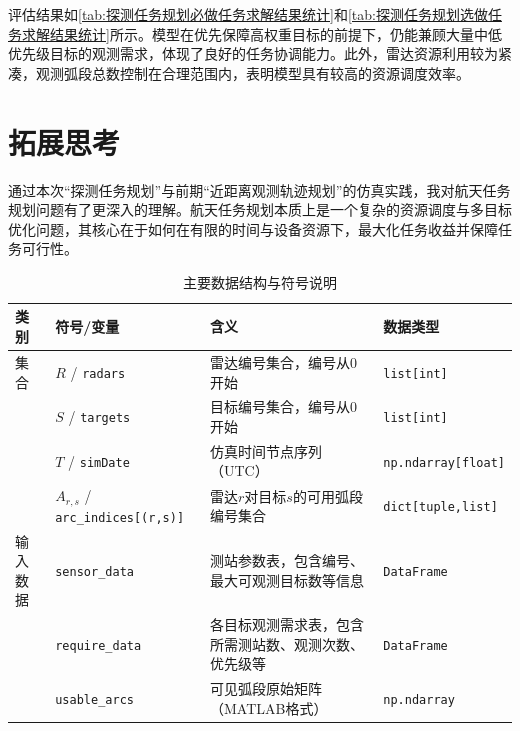 \documentclass[openany,12pt,UTF8]{ctexart}
\begin{document}
评估结果如\autoref{tab:探测任务规划必做任务求解结果统计}和\autoref{tab:探测任务规划选做任务求解结果统计}所示。模型在优先保障高权重目标的前提下，仍能兼顾大量中低优先级目标的观测需求，体现了良好的任务协调能力。此外，雷达资源利用较为紧凑，观测弧段总数控制在合理范围内，表明模型具有较高的资源调度效率。

\section{拓展思考}
通过本次“探测任务规划”与前期“近距离观测轨迹规划”的仿真实践，我对航天任务规划问题有了更深入的理解。航天任务规划本质上是一个复杂的资源调度与多目标优化问题，其核心在于如何在有限的时间与设备资源下，最大化任务收益并保障任务可行性。

\begin{table}
    \centering
    \caption{主要数据结构与符号说明}
    \label{table:主要数据结构与符号说明}
    \begin{tabularx}{\columnwidth}{llXl}
        \toprule
        类别   & 符号/变量                                                  & 含义                                             & 数据类型                       \\
        \midrule
        集合   & $R$ / \texttt{radars}                                  & 雷达编号集合，编号从0开始                                  & \texttt{list[int]}         \\
             & $S$ / \texttt{targets}                                 & 目标编号集合，编号从0开始                                  & \texttt{list[int]}         \\
             & $T$ / \texttt{simDate}                                 & 仿真时间节点序列（UTC）                                  & \texttt{np.ndarray[float]} \\
             & $A_{r,s}$ / \texttt{arc\_indices[(r,s)]}               & 雷达$r$对目标$s$的可用弧段编号集合                           & \texttt{dict[tuple,list]}  \\
        输入数据 & \texttt{sensor\_data}                                  & 测站参数表，包含编号、最大可观测目标数等信息                         & \texttt{DataFrame}         \\
             & \texttt{require\_data}                                 & 各目标观测需求表，包含所需测站数、观测次数、优先级等                     & \texttt{DataFrame}         \\
             & \texttt{usable\_arcs}                                  & 可见弧段原始矩阵（MATLAB格式）                             & \texttt{np.ndarray}        \\

\end{tabularx}
\end{table}
\end{document}
